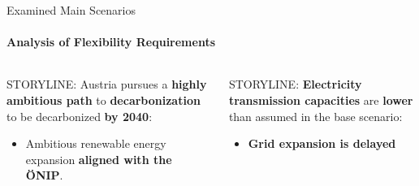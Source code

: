 \documentclass[aspectratio=169]{beamer}
\begin{document}
\begin{frame}{Examined Main Scenarios}
    \framesubtitle{Analysis of Flexibility Requirements}

    \vspace{-0.8cm}
    \begin{columns}
        \begin{column}{0.32\textwidth}
            \begin{coloredblock}
                \begin{minipage}[t][2.5cm]{0.9\textwidth} 
                    \scriptsize STORYLINE: Austria pursues a \textbf{highly ambitious path} to \textbf{decarbonization} to be decarbonized \textbf{by 2040}:
                \end{minipage}
                \begin{minipage}[t][2cm]{0.9\textwidth}
                    \begin{itemize}
                        \item \scriptsize Ambitious renewable energy expansion \textbf{aligned with the ÖNIP}.
                    \end{itemize}
                \end{minipage}
                \begin{minipage}[t][3.7cm]{0.9\textwidth} 
                    \scriptsize ~
                \end{minipage}
            \end{coloredblock}
        \end{column}
        \begin{column}{0.32\textwidth}
            \begin{coloredblock}
                \begin{minipage}[t][2.5cm]{0.9\textwidth} 
                    \scriptsize STORYLINE: \textbf{Electricity transmission capacities} are \textbf{lower} than assumed in the base scenario:
                \end{minipage}
                \begin{minipage}[t][2cm]{0.9\textwidth}
                    \begin{itemize}
                        \item \scriptsize \textbf{Grid expansion is delayed}
                    \end{itemize}

\end{minipage}
\end{coloredblock}
\end{column}
\end{columns}
\end{frame}
\end{document}
